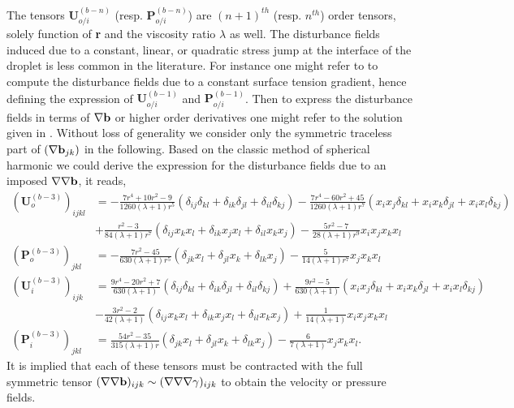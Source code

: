 The tensors $\textbf{U}^{(b-n)}_{o/i}$ (resp. $\textbf{P}^{(b-n)}_{o/i}$) are $(n+1)^{th}$ (resp. $n^{th}$) order tensors, solely function of \textbf{r} and the viscosity ratio $\lambda$ as well. 
The disturbance fields induced due to a constant, linear, or quadratic stress jump at the interface of the droplet is less common in the literature. 
For instance one might refer to \citet{Subramanian_1985,leal2007advanced} to compute the disturbance fields due to a constant surface tension gradient, hence defining the expression of  $\textbf{U}_{o/i}^{(b-1)}$ and $\textbf{P}_{o/i}^{(b-1)}$. 
Then to express the disturbance fields in terms of $\mathbf{\nabla} \textbf{b}$ or higher order derivatives one might refer to the solution given in \citet[Appendix C]{raja2010inertial}.
Without loss of generality we consider only the symmetric traceless part of $(\mathbf{\nabla} \textbf{b}_{jk})$ in the following. 
Based on the classic method of spherical harmonic \citep[chapter 8]{leal2007advanced} we could derive the expression for the disturbance fields due to an imposed $\mathbf{\nabla}\mathbf{\nabla} \textbf{b}$, it reads,
\begin{align*}
    (\textbf{U}_o^{(b-3)})_{ijkl}
    &=
    -\frac{7r^4+10r^2-9}{1260(\lambda+1)r^5}(
        \delta_{ij}\delta_{kl}
        + \delta_{ik}\delta_{jl}
        + \delta_{il}\delta_{kj}
        )
    -\frac{7r^4-60r^2+45}{1260(\lambda+1)r^7}(
        x_ix_j\delta_{kl}
        + x_ix_k\delta_{jl}
        + x_ix_l\delta_{kj}
        )\\
    &+ \frac{r^2 -3}{84(\lambda +1)r^7}(
        \delta_{ij}x_kx_l
        + \delta_{ik}x_jx_l
        + \delta_{il}x_kx_j
    )
    - \frac{5r^2 - 7}{28(\lambda+1)r^9}x_ix_jx_kx_l
    \\
    (\textbf{P}_o^{(b-3)})_{jkl}
    &=
    -\frac{7r^2 - 45}{630(\lambda+1)r^5}(
        \delta_{jk}x_l
        + \delta_{jl}x_k
        + \delta_{lk}x_j
    )
    - \frac{5}{14(\lambda+1)r^7}x_jx_kx_l
    \\
    (\textbf{U}_i^{(b-3)})_{ijk}
    &=
    \frac{9r^4-20r^2+7}{630(\lambda+1)}(
        \delta_{ij}\delta_{kl}
        + \delta_{ik}\delta_{jl}
        + \delta_{il}\delta_{kj}
    )
    +\frac{9r^2-5}{630(\lambda+1)}(
        x_ix_j\delta_{kl}
        + x_ix_k\delta_{jl}
        + x_ix_l\delta_{kj}
        )\\
    &- \frac{3r^2-2}{42(\lambda +1)}(
        \delta_{ij}x_kx_l
        + \delta_{ik}x_jx_l
        + \delta_{il}x_kx_j
    )
    + \frac{1}{14(\lambda+1)}x_ix_jx_kx_l
    \\
    (\textbf{P}_i^{(b-3)})_{jkl}
    &=
    \frac{54r^2 - 35}{315(\lambda+1)r}(
        \delta_{jk}x_l
        + \delta_{jl}x_k
        + \delta_{lk}x_j
    )
    - \frac{6}{7(\lambda+1)}x_jx_kx_l. 
\end{align*}
It is implied that each of these tensors must be contracted with the full symmetric tensor $(\mathbf{\nabla}\mathbf{\nabla}\textbf{b})_{ijk} \sim (\mathbf{\nabla}\mathbf{\nabla}\mathbf{\nabla}\gamma)_{ijk}$ to obtain the velocity or pressure fields. 


